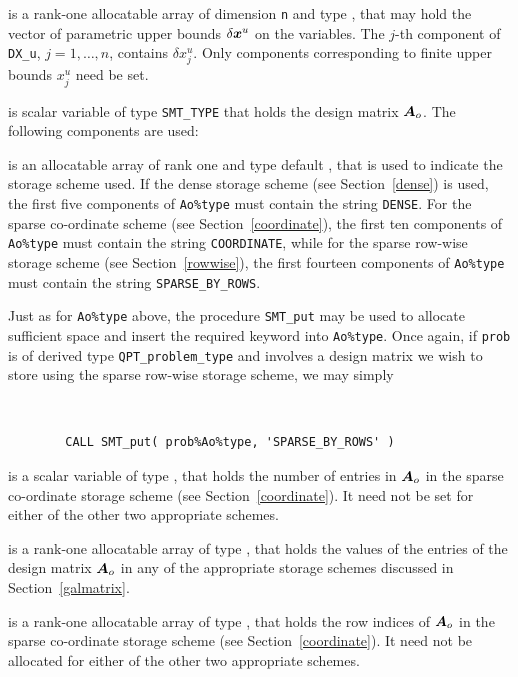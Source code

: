 \documentclass{galahad}
\newcommand{\packagename}{QPT}
\begin{document}
\begin{description}
 is a rank-one allocatable array of dimension {\tt n} and type
\realdp, that may hold the vector of parametric upper bounds
$\delta {\bm{x}}^{u}$  on the variables. The $j$-th component of
{\tt DX\_u}, $j = 1,  \ldots ,  n$, contains $\delta x_{j}^{u}$.
Only components corresponding to finite upper bounds $x_{j}^{u}$
need be set.

 is scalar variable of type {\tt SMT\_TYPE}
that holds the design matrix ${\bm{A}}_o$. The following components are used:

\begin{description}

 is an allocatable array of rank one and type default
\character, that
is used to indicate the storage scheme used. If the dense storage scheme
(see Section~\ref{dense}) is used,
the first five components of {\tt Ao\%type} must contain the
string {\tt DENSE}.
For the sparse co-ordinate scheme (see Section~\ref{coordinate}),
the first ten components of {\tt Ao\%type} must contain the
string {\tt COORDINATE}, while
for the sparse row-wise storage scheme (see Section~\ref{rowwise}),
the first fourteen components of {\tt Ao\%type} must contain the
string {\tt SPARSE\_BY\_ROWS}.

Just as for {\tt Ao\%type} above, the procedure {\tt SMT\_put}
may be used to allocate sufficient space and insert the required keyword
into {\tt Ao\%type}.
Once again, if {\tt prob} is of derived type {\tt \packagename\_problem\_type}
and involves a design matrix we wish to store using the sparse row-wise
storage scheme, we may simply
{\tt
\begin{verbatim}
        CALL SMT_put( prob%Ao%type, 'SPARSE_BY_ROWS' )
\end{verbatim}
}
\noindent

 is a scalar variable of type \integer, that
holds the number of entries in ${\bm{A}}_o$
in the sparse co-ordinate storage scheme (see Section~\ref{coordinate}).
It need not be set for either of the other two appropriate schemes.

 is a rank-one allocatable array of type \realdp, that holds
the values of the entries of the design matrix ${\bm{A}}_o$ in any of the
appropriate storage schemes discussed in Section~\ref{galmatrix}.

 is a rank-one allocatable array of type \integer,
that holds the row indices of ${\bm{A}}_o$ in the sparse co-ordinate storage
scheme (see Section~\ref{coordinate}).
It need not be allocated for either of the other two appropriate schemes.


\end{description}
\end{description}
\end{document}
